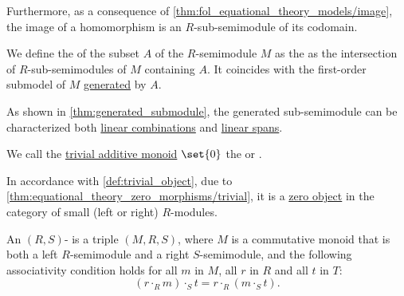 \begin{definition}
\begin{thmenum}[resume=def:semimodule]
    Furthermore, as a consequence of \cref{thm:fol_equational_theory_models/image}, the image of a homomorphism is an \( R \)-sub-semimodule of its codomain.

     We define the  of the subset \( A \) of the \( R \)-semimodule \( M \) as the as the intersection of \( R \)-sub-semimodules of \( M \) containing \( A \). It coincides with the first-order submodel of \( M \) \hyperref[def:fol_generated_substructure]{generated} by \( A \).

    As shown in \cref{thm:generated_submodule}, the generated sub-semimodule can be characterized both \hyperref[def:linear_combination]{linear combinations} and \hyperref[def:linear_span]{linear spans}.

     We call the \hyperref[def:monoid/trivial]{trivial additive monoid} \( \set{ 0 } \) the  or .

    In accordance with \cref{def:trivial_object}, due to \cref{thm:equational_theory_zero_morphisms/trivial}, it is a \hyperref[def:universal_objects/zero]{zero object} in the category of small (left or right) \( R \)-modules.

     An \( (R, S) \)- is a triple \( (M, R, S) \), where \( M \) is a commutative monoid that is both a left \( R \)-semimodule and a right \( S \)-semimodule, and the following associativity condition holds for all \( m \) in \( M \), all \( r \) in \( R \) and all \( t \) in \( T \):
    \begin{equation}\label{eq:def:semimodule/bisemimodule/associativity}
      (r \cdot_R m) \cdot_S t = r \cdot_R (m \cdot_S t).
    \end{equation}
  \end{thmenum}
\end{definition}
